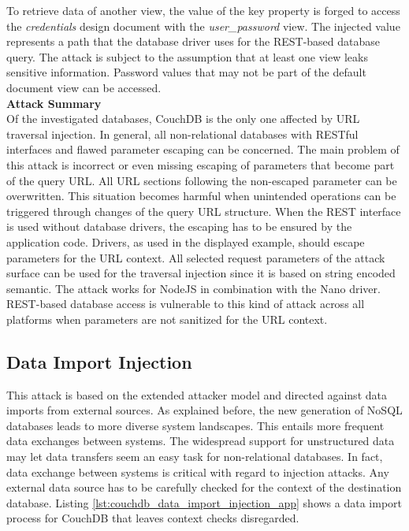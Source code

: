 To retrieve data of another view, the value of the key property is forged to access the \emph{credentials} design document with the \emph{user\_password} view. The injected value represents a path that the database driver uses for the REST-based database query. The attack is subject to the assumption that at least one view leaks sensitive information. Password values that may not be part of the default document view can be accessed. \\

\textbf{Attack Summary} \\
Of the investigated databases, CouchDB is the only one affected by URL traversal injection. In general, all non-relational databases with RESTful interfaces and flawed parameter escaping can be concerned. The main problem of this attack is incorrect or even missing escaping of parameters that become part of the query URL. All URL sections following the non-escaped parameter can be overwritten. This situation becomes harmful when unintended operations can be triggered through changes of the query URL structure. When the REST interface is used without database drivers, the escaping has to be ensured by the application code. Drivers, as used in the displayed example, should escape parameters for the URL context. All selected request parameters of the attack surface can be used for the traversal injection since it is based on string encoded semantic. The attack works for NodeJS in combination with the Nano driver. REST-based database access is vulnerable to this kind of attack across all platforms when parameters are not sanitized for the URL context. 

\subsection{Data Import Injection}
This attack is based on the extended attacker model and directed against data imports from external sources. As explained before, the new generation of NoSQL databases leads to more diverse system landscapes. This entails more frequent data exchanges between systems. The widespread support for unstructured data may let data transfers seem an easy task for non-relational databases. In fact, data exchange between systems is critical with regard to injection attacks. Any external data source has to be carefully checked for the context of the destination database. Listing \ref{lst:couchdb_data_import_injection_app} shows a data import process for CouchDB that leaves context checks disregarded.\\

